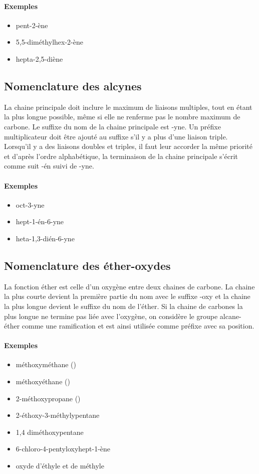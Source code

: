 \paragraph{Exemples}
\begin{itemize}
  \item pent-2-ène
  \item 5,5-diméthylhex-2-ène
  \item hepta-2,5-diène
\end{itemize}

\subsection{Nomenclature des alcynes} 
La chaine principale doit inclure le maximum de liaisons multiples, tout en étant la plus longue  possible, même si elle ne renferme pas le nombre maximum de carbone.
Le suffixe du nom de la chaine principale est -yne.
Un préfixe multiplicateur doit être ajouté au suffixe s'il y a plus d'une liaison triple.
Lorsqu'il y a des liaisons doubles et triples, il faut leur accorder la même priorité et d'après l'ordre alphabétique, la terminaison de la chaine principale s'écrit comme suit -én suivi de -yne.

\paragraph{Exemples}
\begin{itemize}
  \item oct-3-yne
  \item hept-1-én-6-yne
  \item heta-1,3-dién-6-yne
\end{itemize}

\subsection{Nomenclature des éther-oxydes} 
La fonction éther est celle d'un oxygène entre deux chaines de carbone.
La chaine la plus courte devient la première partie du nom avec le suffixe -oxy
et la chaine la plus longue devient le suffixe du nom de l'éther.
Si la chaine de carbones la plus longue ne termine pas liée avec l'oxygène,
on considère le groupe alcane-éther comme une ramification et est ainsi
utilisée comme préfixe avec sa position.

\paragraph{Exemples}
\begin{itemize}
  \item méthoxyméthane ()
  \item méthoxyéthane ()
  \item 2-méthoxypropane ()
  \item 2-éthoxy-3-méthylypentane
  \item 1,4 diméthoxypentane
  \item 6-chloro-4-pentyloxyhept-1-ène
  \item oxyde d'éthyle et de méthyle
\end{itemize}

